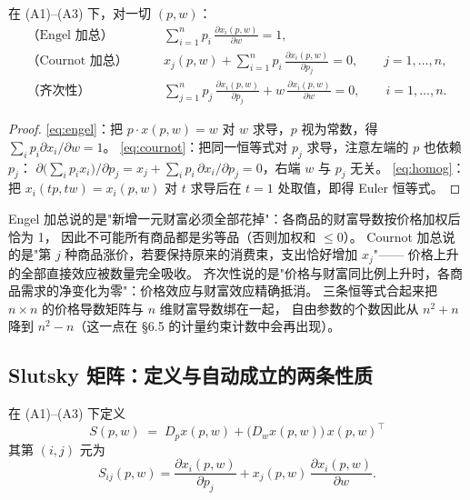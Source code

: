 \begin{proposition}\label{prop:aggr-identities}
在 (A1)--(A3) 下，对一切 $(p,w)$：
\begin{align}
\text{（Engel 加总）}\qquad & \sum_{i=1}^{n}p_i\,\frac{\partial x_i(p,w)}{\partial w}=1,
\label{eq:engel}\\[2pt]
\text{（Cournot 加总）}\qquad & x_j(p,w)+\sum_{i=1}^{n}p_i\,\frac{\partial x_i(p,w)}{\partial p_j}=0,
\qquad j=1,\ldots,n,
\label{eq:cournot}\\[2pt]
\text{（齐次性）}\qquad & \sum_{j=1}^{n}p_j\,\frac{\partial x_i(p,w)}{\partial p_j}
 +w\,\frac{\partial x_i(p,w)}{\partial w}=0,\qquad i=1,\ldots,n.
\label{eq:homog}
\end{align}
\end{proposition}

\begin{proof}
\eqref{eq:engel}：把 $p\cdot x(p,w)=w$ 对 $w$ 求导，$p$ 视为常数，得 $\sum_i p_i\partial x_i/\partial w=1$。
\eqref{eq:cournot}：把同一恒等式对 $p_j$ 求导，注意左端的 $p$ 也依赖 $p_j$：
$\partial\bigl(\sum_i p_ix_i\bigr)/\partial p_j=x_j+\sum_i p_i\,\partial x_i/\partial p_j=0$，右端 $w$ 与 $p_j$ 无关。
\eqref{eq:homog}：把 $x_i(tp,tw)=x_i(p,w)$ 对 $t$ 求导后在 $t=1$ 处取值，即得 Euler 恒等式。
\end{proof}

\begin{remark}[三条恒等式的经济读法]
Engel 加总说的是"新增一元财富必须全部花掉"：各商品的财富导数按价格加权后恰为 1，
因此不可能所有商品都是劣等品（否则加权和 $\le0$）。
Cournot 加总说的是"第 $j$ 种商品涨价，若要保持原来的消费束，支出恰好增加 $x_j$"——
价格上升的全部直接效应被数量完全吸收。
齐次性说的是"价格与财富同比例上升时，各商品需求的净变化为零"：价格效应与财富效应精确抵消。
三条恒等式合起来把 $n\times n$ 的价格导数矩阵与 $n$ 维财富导数绑在一起，
自由参数的个数因此从 $n^2+n$ 降到 $n^2-n$（这一点在 \S 6.5 的计量约束计数中会再出现）。
\end{remark}

\subsection{Slutsky 矩阵：定义与自动成立的两条性质}

\begin{definition}[Slutsky 矩阵]\label{def:slutsky}
在 (A1)--(A3) 下定义
\[
 \boxed{\;S(p,w)\;=\;D_px(p,w)+\bigl(D_wx(p,w)\bigr)\,x(p,w)^{\!\top}\;}
\]
其第 $(i,j)$ 元为
\[
 S_{ij}(p,w)=\frac{\partial x_i(p,w)}{\partial p_j}
 +x_j(p,w)\,\frac{\partial x_i(p,w)}{\partial w}.
\]
\end{definition}

